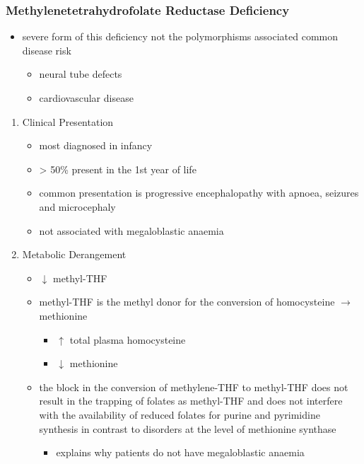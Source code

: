 \documentclass{scrartcl}
\begin{document}
\subsubsection{Methylenetetrahydrofolate Reductase Deficiency}
\label{sec:orgff6d81e}
\begin{itemize}
\item severe form of this deficiency not the polymorphisms associated
common disease risk
\begin{itemize}
\item neural tube defects
\item cardiovascular disease
\end{itemize}
\end{itemize}
\begin{enumerate}
\item Clinical Presentation
\label{sec:org1a79660}
\begin{itemize}
\item most diagnosed in infancy
\item \textgreater{} 50\% present in the 1st year of life
\item common presentation is progressive encephalopathy with apnoea,
seizures and microcephaly
\item not associated with megaloblastic anaemia
\end{itemize}

\item Metabolic Derangement
\label{sec:org6a001a3}
\begin{itemize}
\item \(\downarrow\) methyl-THF
\item methyl-THF is the methyl donor for the conversion of homocysteine \(\to\) methionine
\begin{itemize}
\item \(\uparrow\) total plasma homocysteine
\item \(\downarrow\) methionine
\end{itemize}
\item the block in the conversion of methylene-THF to methyl-THF does not
result in the trapping of folates as methyl-THF and does not
interfere with the availability of reduced folates for purine and
pyrimidine synthesis in contrast to disorders at the level of
methionine synthase
\begin{itemize}
\item explains why patients do not have megaloblastic anaemia
\end{itemize}
\end{itemize}


\end{enumerate}
\end{document}
